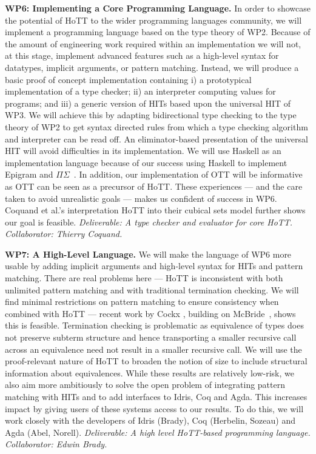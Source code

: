 \documentclass[a4paper,11pt]{article}
\begin{document}
{\bf WP6: Implementing a Core Programming Language.} In order to
showcase the potential of HoTT to the wider programming languages
community, we will implement a programming language based on the type
theory of WP2.  Because of the amount of engineering work required
within an implementation we will not, at this stage, implement
advanced features such as a high-level syntax for datatypes, implicit
arguments, or pattern matching. Instead, we will produce a basic proof
of concept implementation containing i) a prototypical implementation
of a type checker; ii) an interpreter computing values for programs;
and iii) a generic version of HITs based upon the universal HIT of
WP3. We will achieve this by adapting bidirectional type checking to
the type theory of WP2 to get syntax directed rules from which a type
checking algorithm and interpreter can be read off. An
eliminator-based presentation of the universal HIT will
avoid difficulties in its implementation. We will use Haskell as an
implementation language because of our 
success using Haskell to implement Epigram and
$\Pi\Sigma$~\cite{alti:checking,easy,alti:pisigma-new}. In addition,
our implementation of OTT will be informative as OTT can be seen as a
precursor of HoTT.  These experiences --- and the care taken to avoid
unrealistic goals --- makes us confident of success in
WP6. Coquand et al.'s interpretation HoTT into their cubical sets
model further shows our goal is feasible. {\em Deliverable: A type
  checker and evaluator for core HoTT.  Collaborator: Thierry Coquand.
}


{\bf WP7: A High-Level Language.} We will make the
language of WP6 more usable by adding implicit arguments and
high-level syntax for HITs and pattern matching. There are real
problems here --- HoTT is inconsistent with both unlimited pattern
matching and with traditional termination checking. We will find
minimal restrictions on pattern matching to ensure consistency when
combined with HoTT --- recent work by Cockx \cite{cockx-without-k},
building on McBride~\cite{viewftl}, shows this is
feasible. Termination checking is problematic as equivalence of types
does not preserve subterm structure and hence transporting a smaller
recursive call across an equivalence need not result in a smaller
recursive call. We will use the proof-relevant nature of HoTT to
broaden the notion of size to include structural information about
equivalences. While these results are relatively low-risk, we also aim
more ambitiously to solve the open problem of integrating pattern
matching with HITs and to add interfaces to Idris, Coq and Agda. This
increases impact by giving users of these systems access to our
results. To do this, we will work closely with the developers of Idris
(Brady), Coq (Herbelin, Sozeau) and Agda (Abel, Norell). {\em
  Deliverable: A high level HoTT-based programming language.
  Collaborator: Edwin Brady.  }
\end{document}
